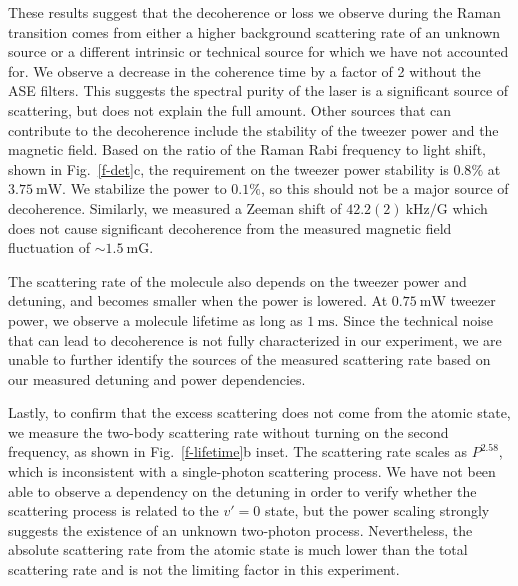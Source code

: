 \documentclass[aps,prl,twocolumn,10pt,superscriptaddress]{revtex4-1}
\newcommand{\todo}[1]{}
\begin{document}
\todo{change scattering to decoherence? since the fluctuation of light shift
  does not lead to scattering but only decherence.}
These results suggest that the decoherence or loss we observe during the Raman transition
comes from either a higher background scattering rate of an unknown source
or a different intrinsic or technical source for which we have not accounted for.
We observe a decrease in the coherence time by a factor of 2 without the ASE filters. This
suggests the spectral purity of the laser is a significant source of scattering, but does not explain the full amount.
Other sources that can contribute to the decoherence include
the stability of the tweezer power and the magnetic field.
Based on the ratio of the Raman Rabi frequency to light shift, shown in Fig.~\ref{f-det}c,
the requirement on the tweezer power stability is $0.8\mathrm{\%}$ at $3.75~\mathrm{mW}$. We stabilize the power to $0.1\mathrm{\%}$, so this should not be a major source of decoherence.
Similarly, we measured a Zeeman shift of $42.2(2)~\mathrm{kHz/G}$
which does not cause significant decoherence from the measured magnetic field
fluctuation of $\sim1.5~\mathrm{mG}$.

The scattering rate of the molecule also depends on the tweezer power and detuning, and becomes smaller when the power is lowered.
At $0.75~\mathrm{mW}$ tweezer power, we observe a molecule lifetime as long as $1~\mathrm{ms}$.
Since the technical noise that can lead to decoherence
is not fully characterized in our experiment,
we are unable to further identify the sources of the measured scattering rate
based on our measured detuning and power dependencies.

Lastly, to confirm that the excess scattering does not come from the atomic state,
we measure the two-body scattering rate
without turning on the second frequency, as shown in Fig.~\ref{f-lifetime}b inset.
The scattering rate scales as $P^{2.58}$,
which is inconsistent with a single-photon scattering process.
We have not been able to observe a dependency on the detuning in order to verify whether the scattering process is related to the $v'=0$ state,
but the power scaling strongly suggests the existence of an unknown two-photon process.
Nevertheless, the absolute scattering rate from the atomic state
is much lower than the total scattering rate
and is not the limiting factor in this experiment.
\end{document}

